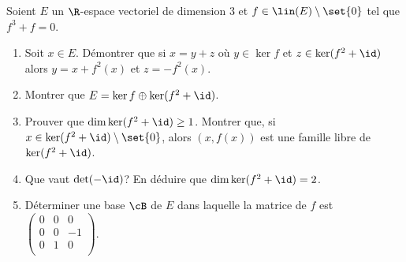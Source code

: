 \begin{enonce}
\begin{exercise}[ID={RMS126 E866},subtitle={Oral CCP MP 2015},tags={mpsi},difficulty={}]
Soient $E$ un $\R$-espace vectoriel de dimension $3$ et $f\in\lin(E)\setminus\set{0}$ tel que $f^3+f=0$.
\begin{enumerate}
  \item 
    Soit $x\in E$.
    Démontrer que si $x=y+z$ où $y\in\ker f$ et $z\in\ker(f^2+\id)$ alors $y=x+f^2(x)$ et $z=-f^2(x)$.

  \item
    Montrer que $E=\ker f \oplus \ker(f^2+\id)$.

  \item
    Prouver que $\dim\ker(f^2+\id)\geq 1$.
    Montrer que, si $x\in\ker(f^2+\id)\setminus\set{0}$, alors $(x,f(x))$ est une famille libre de $\ker(f^2+\id)$.

  \item
    Que vaut $\det(-\id)$?
    En déduire que $\dim \ker (f^2+\id) = 2$.

  \item
    Déterminer une base $\cB$ de $E$ dans laquelle la matrice de $f$ est
    $\begin{pmatrix} 0 & 0 & 0 \\ 0 & 0 & -1 \\ 0 & 1 & 0 \\ \end{pmatrix}$.
\end{enumerate}
\end{exercise}
\begin{solution}
\end{solution}
\end{enonce}
